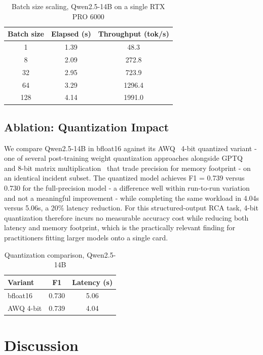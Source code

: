 \documentclass[10pt,conference]{IEEEtran}
\begin{document}
\begin{table}[t]
\centering
\caption{Batch size scaling, Qwen2.5-14B on a single RTX PRO 6000}
\label{tab:batch-sweep}
\begin{tabular}{ccc}
\toprule
Batch size & Elapsed (s) & Throughput (tok/s) \\
\midrule
1   & 1.39 & 48.3 \\
8   & 2.09 & 272.8 \\
32  & 2.95 & 723.9 \\
64  & 3.29 & 1296.4 \\
128 & 4.14 & 1991.0 \\
\bottomrule
\end{tabular}
\end{table}

\subsection{Ablation: Quantization Impact}

We compare Qwen2.5-14B in bfloat16 against its AWQ~\cite{lin2024awq}
4-bit quantized variant - one of several post-training weight
quantization approaches alongside GPTQ~\cite{frantar2023gptq} and
8-bit matrix multiplication~\cite{dettmers2022llmint8} that trade
precision for memory footprint -
on an identical incident subset. The quantized model achieves
F1 = 0.739 versus 0.730 for the full-precision model - a difference well
within run-to-run variation and not a meaningful improvement - while
completing the same workload in 4.04s versus 5.06s, a 20\% latency
reduction. For this structured-output RCA task, 4-bit quantization
therefore incurs no measurable accuracy cost while reducing both latency
and memory footprint, which is the practically relevant finding for
practitioners fitting larger models onto a single card.

\begin{table}[t]
\centering
\caption{Quantization comparison, Qwen2.5-14B}
\label{tab:quantization}
\begin{tabular}{lcc}
\toprule
Variant & F1 & Latency (s) \\
\midrule
bfloat16  & 0.730 & 5.06 \\
AWQ 4-bit & 0.739 & 4.04 \\
\bottomrule
\end{tabular}
\end{table}


\section{Discussion}
\end{document}
